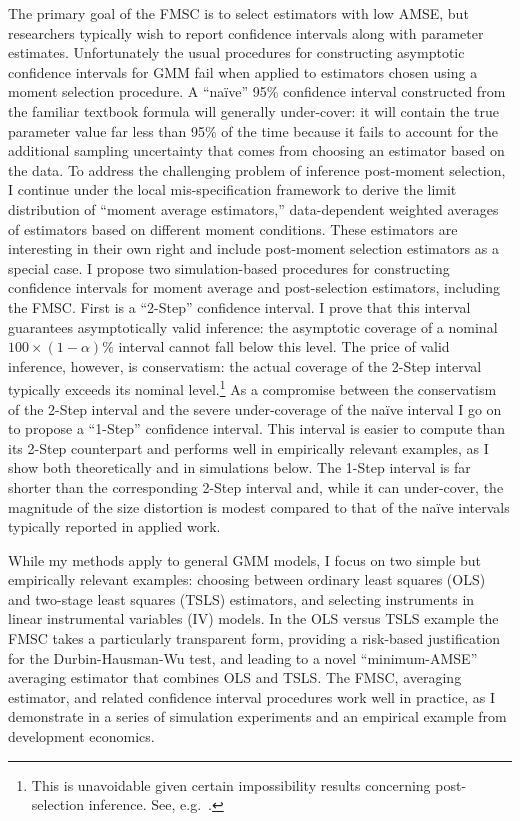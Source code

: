 The primary goal of the FMSC is to select estimators with low AMSE, but researchers typically wish to report confidence intervals along with parameter estimates.
Unfortunately the usual procedures for constructing asymptotic confidence intervals for GMM fail when applied to estimators chosen using a moment selection procedure.
A ``na\"{i}ve'' 95\% confidence interval constructed from the familiar textbook formula will generally under-cover: it will contain the true parameter value far less than 95\% of the time because it fails to account for the additional sampling uncertainty that comes from choosing an estimator based on the data. 
To address the challenging problem of inference post-moment selection, I continue under the local mis-specification framework to derive the limit distribution of ``moment average estimators,'' data-dependent weighted averages of estimators based on different moment conditions.
These estimators are interesting in their own right and include post-moment selection estimators as a special case.
I propose two simulation-based procedures for constructing confidence intervals for moment average and post-selection estimators, including the FMSC.
First is a ``2-Step'' confidence interval.
I prove that this interval guarantees asymptotically valid inference: the asymptotic coverage of a nominal $100 \times (1 - \alpha)\%$ interval cannot fall below this level.
The price of valid inference, however, is conservatism: the actual coverage of the 2-Step interval typically exceeds its nominal level.\footnote{This is unavoidable given certain impossibility results concerning post-selection inference. See, e.g.\ \cite{LeebPoetscher2005}.}
As a compromise between the conservatism of the 2-Step interval and the severe under-coverage of the na\"{i}ve interval I go on to propose a ``1-Step'' confidence interval. 
This interval is easier to compute than its 2-Step counterpart and performs well in empirically relevant examples, as I show both theoretically and in simulations below.
The 1-Step interval is far shorter than the corresponding 2-Step interval and, while it can under-cover, the magnitude of the size distortion is modest compared to that of the na\"{i}ve intervals typically reported in applied work.  

While my methods apply to general GMM models, I focus on two simple but empirically relevant examples: choosing between ordinary least squares (OLS) and two-stage least squares (TSLS) estimators, and selecting instruments in linear instrumental variables (IV) models. 
In the OLS versus TSLS example the FMSC takes a particularly transparent form, providing a risk-based justification for the Durbin-Hausman-Wu test, and leading to a novel ``minimum-AMSE'' averaging estimator that combines OLS and TSLS.
The FMSC, averaging estimator, and related confidence interval procedures work well in practice, as I demonstrate in a series of simulation experiments and an empirical example from development economics.

